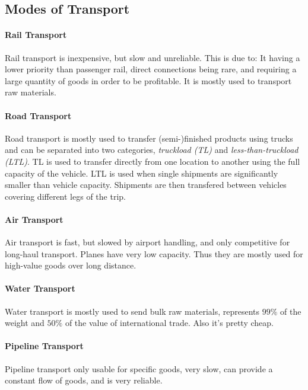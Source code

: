 \documentclass[english]{panikzettel}
\begin{document}
\subsection{Modes of Transport}

\paragraph{Rail Transport}
Rail transport is inexpensive, but slow and unreliable. This is due to: It having a lower priority than passenger rail, direct connections being rare, and requiring a large quantity of goods in order to be profitable. It is mostly used to transport raw materials.

\vspace{-\baselineskip}
\paragraph{Road Transport}
Road transport is mostly used to transfer (semi-)finished products using trucks and can be separated into two categories, \emph{truckload (TL)} and \emph{less-than-truckload (LTL)}.
TL is used to transfer directly from one location to another using the full capacity of the vehicle.
LTL is used when single shipments are significantly smaller than vehicle capacity.
Shipments are then transfered between vehicles covering different legs of the trip.

\vspace{-\baselineskip}
\paragraph{Air Transport}
Air transport is fast, but slowed by airport handling, and only competitive for long-haul transport.
Planes have very low capacity.
Thus they are mostly used for high-value goods over long distance.

\vspace{-\baselineskip}
\paragraph{Water Transport}
Water transport is mostly used to send bulk raw materials, represents $99\%$ of the weight and $50\%$ of the value of international trade.
Also it's pretty cheap.

\vspace{-\baselineskip}
\paragraph{Pipeline Transport}
Pipeline transport only usable for specific goods, very slow, can provide a constant flow of goods, and is very reliable.
\end{document}
